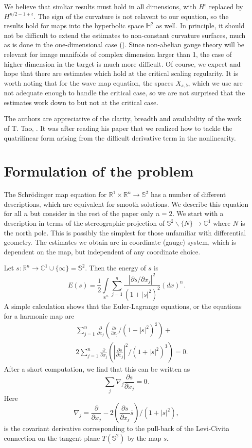 \documentclass[draft,11pt,leqno]{amsart}
\newcommand{\rn}{{\mathbb R}^n}
\newcommand{\rone}{\mathbb R^1}
\newcommand{\cone}{\mathbb C^1}
\newcommand{\stwo}{\mathbb S^2}
\newcommand{\intl}{\int\limits}
\newcommand{\suml}{\sum\limits}
\newcommand{\f}{\displaystyle\frac}
\newcommand{\p}{\partial}
\newcommand{\pp}[2]{\f{\p #1}{\p #2}}
\begin{document}
We believe that  simliar results must hold in all dimensions, with 
$H^{\epsilon}$ replaced by $H^{n/2  -1  + \epsilon}$.   The sign of the 
curvature is not relavent to our equation, so the results hold for 
maps into the hyperbolic space ${\mathbb H^2}$ as well. 
In principle, it should not be difficult to extend the estimates to 
non-constant curvature surfaces, much as is done in the 
one-dimensional case (\cite{Chang}). 
 Since non-abelian gauge theory will be relevant for 
image manifolds of complex dimension larger than 1,  the case of 
higher dimension in the target is much more difficult.  Of course, we 
expect and hope that there are estimates which hold at the critical 
scaling regularity.  It is worth noting that for the  wave map equation,
the  spaces $X_{s,b}$, which we use  are not adequate enough to 
handle the critical case, so we are not surprised that the estimates work
down to but not at the critical case.

The authors are appreciative of the clarity, breadth and availability of the 
work of T. Tao, \cite{Tao}. It was after reading his paper that we realized how to tackle the quatrilinear form arising from the difficult derivative term 
in the nonlinearity.    

\vspace{.2cm}

\section{Formulation of the problem}
\label{sec:1}

\vspace{.5cm}

The Schr\"odinger map equation for $\rone\times\rn\to\stwo$ has a number 
of different descriptions, which are equivalent for smooth solutions. 
We describe this equation for all $n$ but consider in the rest of the paper 
only $n=2$. We start with a description in terms of the stereographic
 projection of $\stwo\smallsetminus\{N\} \to\cone$ where $N$ is the north pole. This is possibly the simplest for those 
unfamiliar with differential geometry. The estimates we obtain are in 
coordinate (gauge) system, which is dependent on the map, but  independent 
of any coordinate choice.

Let $s:\rn\to\cone\cup\{\infty\}=\stwo$. Then the energy of $s$ is 
$$
E(s)=\f{1}{2}\intl_{\rn}\suml_{j=1}^n
\f{\left|\p s/\p x_j\right|^2}{(1+|s|^2)^2}(dx)^n.
$$
A simple calculation shows that the Euler-Lagrange equations, or the 
equations for a harmonic map are 
\begin{eqnarray*}
& &\suml_{j=1}^n\pp{}{x_j}\left(\pp{s}{x_j}/(1+|s|^2)^2\right)+\\
& &2\suml_{j=1}^n\pp{}{x_j}\left(\left|\pp{s}{x_j}\right|^2/(1+|s|^2)^3\right)
=0.
\end{eqnarray*}
After a short computation, we find that this can be written as 
$$
\suml_j\nabla_j \pp{s}{x_j} =0.
$$
Here
$$
\nabla_j=\pp{}{x_j}-2\left(\pp{s}{x_j}\overline{s}\right)/(1+|s|^2),
$$
is the covariant derivative corresponding to the pull-back of the Levi-Civita 
connection on the tangent plane ${T}(\stwo)$ by the map $s$.
\end{document}
